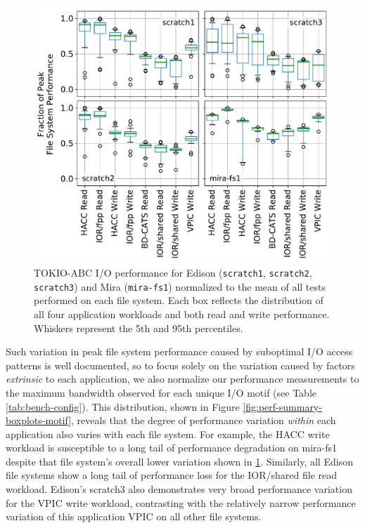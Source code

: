 \documentclass[conference,10pt,compsocconf]{IEEEtran}
\begin{document}
\begin{figure}[t]
	\centering
	\includegraphics[width=1.0\columnwidth]{figs/perf-boxplots-per-fs.pdf}
	\caption{TOKIO-ABC I/O performance for Edison (\texttt{scratch1},
	\texttt{scratch2}, \texttt{scratch3}) and Mira (\texttt{mira-fs1}) normalized to
	the mean of all tests performed on each file system.  Each box reflects the
	distribution of all four application workloads and both read and write
	performance. Whiskers represent the 5th and 95th percentiles.}
	\label{fig:perf-summary-boxplots-fs}
\end{figure}

Such variation in peak file system performance caused by suboptimal I/O access patterns is well documented\cite{Lofstead2010,Uselton2010,Xie2012}, so to focus solely on the variation caused by factors \emph{extrinsic} to each application, we also normalize our performance measurements to the maximum bandwidth observed for each unique I/O motif (see Table \ref{tab:bench-config}).  This distribution, shown in Figure \ref{fig:perf-summary-boxplots-motif}, reveals that the degree of performance variation \emph{within} each application also varies with each file system.  For example, the HACC write workload is susceptible to a long tail of performance degradation on mira-fs1 despite
that file system's overall lower variation shown in \ref{fig:perf-summary-boxplots-fs}.  Similarly, all Edison file systems show a long tail of performance loss for the IOR/shared file read workload.  Edison's scratch3 also demonstrates very broad performance variation for the VPIC write workload, contrasting with the relatively narrow performance variation of this application VPIC on all other file systems.
\end{document}
